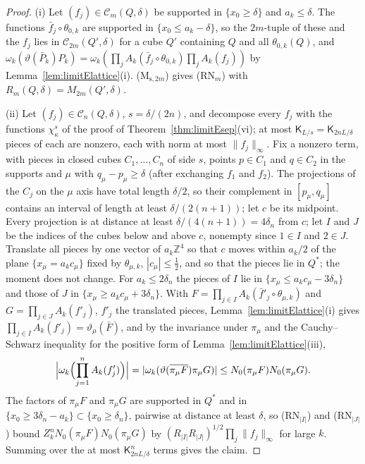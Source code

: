 \documentclass[aps,prd,twocolumn,superscriptaddress,nofootinbib,longbibliography,floatfix,amsmath,amssymb,10pt]{revtex4-2}
\theoremstyle{definition}
\theoremstyle{remark}
\newcommand{\Z}{\mathbb{Z}}
\begin{document}
\begin{proof}
(i) Let $(f_j)\in\mathcal C_m(Q,\delta)$ be supported in $\{x_0\ge\delta\}$
and $a_k\le\delta$. The functions $\bar f_j\circ\theta_{0,k}$ are supported in
$\{x_0\le a_k-\delta\}$, so the $2m$-tuple of these and the $f_j$ lies in
$\mathcal C_{2m}(Q',\delta)$ for a cube $Q'$ containing $Q$ and all
$\theta_{0,k}(Q)$, and $\omega_k(\vartheta(\bar P_k)P_k)=\omega_k(\prod_j
A_k(\bar f_j\circ\theta_{0,k})\prod_jA_k(f_j))$ by
Lemma~\ref{lem:limitElattice}(i). (M$_{\mathrm s,2m}$) gives (RN$_m$) with
$R_m(Q,\delta)=M_{2m}(Q',\delta)$.

(ii) Let $(f_j)\in\mathcal C_n(Q,\delta)$, $s=\delta/(2n)$, and decompose
every $f_j$ with the functions $\chi^s_\kappa$ of the proof of
Theorem~\ref{thm:limitEsep}(vi); at most $\mathsf K_{L/s}=\mathsf
K_{2nL/\delta}$ pieces of each are nonzero, each with norm at most
$\|f_j\|_\infty$. Fix a nonzero term, with pieces in closed cubes
$C_1,\dots,C_n$ of side $s$, points $p\in C_1$ and $q\in C_2$ in the supports
and $\mu$ with $q_\mu-p_\mu\ge\delta$ (after exchanging $f_1$ and $f_2$).
The projections of the $C_j$ on the $\mu$ axis have total length $\delta/2$,
so their complement in $[p_\mu,q_\mu]$ contains an interval of length at
least $\delta/(2(n+1))$; let $c$ be its midpoint. Every projection is at
distance at least $\delta/(4(n+1))=4\delta_n$ from $c$; let $I$ and $J$ be
the indices of the cubes below and above $c$, nonempty since $1\in I$ and
$2\in J$. Translate all pieces by one vector of $a_k\Z^4$ so that $c$ moves
within $a_k/2$ of the plane $\{x_\mu=a_kc_\mu\}$ fixed by $\theta_{\mu,k}$,
$|c_\mu|\le\frac12$, and so that the pieces lie in $Q^*$; the moment does not
change. For $a_k\le2\delta_n$ the pieces of $I$ lie in $\{x_\mu\le a_kc_\mu
-3\delta_n\}$ and those of $J$ in $\{x_\mu\ge a_kc_\mu+3\delta_n\}$. With
$F=\prod_{j\in I}A_k(\bar f'_j\circ\theta_{\mu,k})$ and $G=\prod_{j\in J}
A_k(f'_j)$, $f'_j$ the translated pieces, Lemma~\ref{lem:limitElattice}(i)
gives $\prod_{j\in I}A_k(f'_j)=\vartheta_\mu(\bar F)$, and by the invariance
under $\pi_\mu$ and the Cauchy--Schwarz inequality for the positive form of
Lemma~\ref{lem:limitElattice}(iii),
\[
\Bigl|\omega_k\Bigl(\prod_{j=1}^nA_k(f'_j)\Bigr)\Bigr|=|\omega_k(
\vartheta(\overline{\pi_\mu F})\pi_\mu G)|\le N_0(\pi_\mu F)N_0(\pi_\mu G).
\]
The factors of $\pi_\mu F$ and $\pi_\mu G$ are supported in $Q^*$ and in
$\{x_0\ge3\delta_n-a_k\}\subset\{x_0\ge\delta_n\}$, pairwise at distance at
least $\delta$, so (RN$_{|I|}$) and (RN$_{|J|}$) bound $Z_k^nN_0(\pi_\mu F)
N_0(\pi_\mu G)$ by $(R_{|I|}R_{|J|})^{1/2}\prod_j\|f_j\|_\infty$ for large $k$.
Summing over the at most $\mathsf K_{2nL/\delta}^n$ terms gives the claim.


\end{proof}
\end{document}
